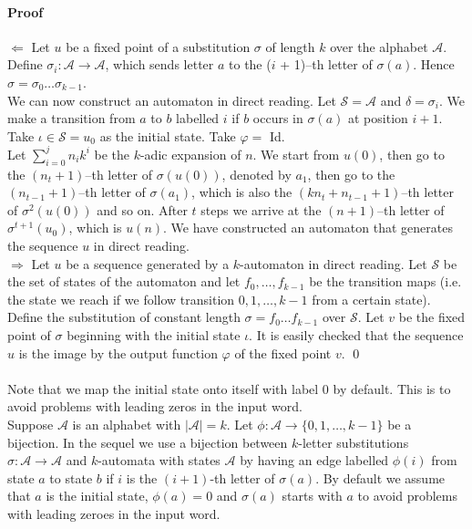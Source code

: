 \documentclass{article}
\begin{document}
\paragraph{Proof}
$\Leftarrow$ Let $u$ be a fixed point of a substitution $\sigma$ of length
$k$ over the alphabet $\mathcal{A}$. Define
$\sigma_i: \mathcal{A} \rightarrow \mathcal{A}$, which sends letter $a$ to the
($i$ + 1)--th letter of $\sigma(a)$. Hence
$\sigma = \sigma_0 \ldots \sigma_{k - 1}$.\\
We can now construct an automaton in direct reading. Let $\mathcal{S = A}$ and
$\delta = \sigma_i$. We make a transition from $a$ to $b$ labelled $i$ if $b$
occurs in $\sigma(a)$ at position $i + 1$. Take $\iota \in \mathcal{S} = u_0$
as the initial state. Take $\varphi =$ Id.\\
Let $\sum_{i = 0}^j n_i k^i$ be the $k$-adic expansion of $n$. We start from 
$u(0)$, then go to the $(n_t + 1)$--th letter of $\sigma(u(0))$, denoted by 
$a_1$, then go to the $(n_{t - 1} + 1)$--th letter of $\sigma(a_1)$, which is 
also the $(kn_t + n_{t - 1} + 1)$--th letter of $\sigma^2(u(0))$ and so on.
After $t$ steps we arrive at the $(n + 1)$--th letter of $\sigma^{t + 1}(u_0)$,
which is $u(n)$. We have constructed an automaton that generates the sequence 
$u$ in direct reading.\\
$\Rightarrow$ Let $u$ be a sequence generated by a $k$-automaton in direct
reading. Let $\mathcal{S}$ be the set of states of the automaton and let
$f_0, \ldots, f_{k - 1}$ be the transition maps (i.e. the state we reach if we
follow transition $0, 1, \ldots, k - 1$ from a certain state). Define the 
substitution of constant length $\sigma = f_0 \dots f_{k - 1}$ over 
$\mathcal{S}$. Let $v$ be the fixed point of $\sigma$ beginning with the 
initial state $\iota$. It is easily checked that the sequence $u$ is the image
by the output function $\varphi$ of the fixed point $v$. \qed\\
\\
Note that we map the initial state onto itself with label 0 by default. This
is to avoid problems with leading zeros in the input word.\\
Suppose $\mathcal{A}$ is an alphabet with $|\mathcal{A}| = k$. Let 
$\phi: \mathcal{A} \rightarrow \{0, 1, \ldots, k - 1\}$ be a bijection. In the
sequel we use a bijection between $k$-letter substitutions 
$\sigma: \mathcal{A} \rightarrow \mathcal{A}$ and $k$-automata with states 
$\mathcal{A}$ by having an edge labelled $\phi(i)$ from state $a$ to state $b$ 
if $i$ is the $(i + 1)$-th letter of $\sigma(a)$. By default we assume that
$a$ is the initial state, $\phi(a) = 0$ and $\sigma(a)$ starts with $a$ to 
avoid problems with leading zeroes in the input word.
\end{document}

